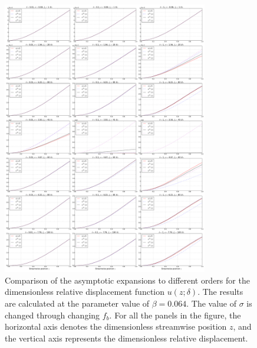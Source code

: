 \documentclass{article}
\begin{document}
\begin{figure}[!htbp]
    \centering
    \includegraphics[width=0.8\textwidth]{./img_eig_asy/fig_sol_analytic_disp_cmp_fr_all}
    \caption{Comparison of the asymptotic expansions to different orders for the dimensionless relative displacement function $u(z;\delta)$. The results are calculated at the parameter value of $\beta = 0.064$. The value of $\sigma$ is changed through changing $f_b$. For all the panels in the figure, the horizontal axis denotes the dimensionless streamwise position $z$, and the vertical axis represents the dimensionless relative displacement. }
    \label{fig:fig_sol_analytic_disp_cmp_fr_all}
\end{figure}
\end{document}
